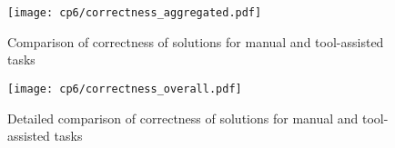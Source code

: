 


% 






\label{fig:correctness-overall}


\begin{figure}[h!]
    \centering
    \texttt{[image: cp6/correctness\_aggregated.pdf]}
    \caption{Comparison of correctness of solutions for manual and tool-assisted tasks}
    \label{fig:correctness-overall}
\end{figure}






\begin{figure}[h!]
    \centering
    \texttt{[image: cp6/correctness\_overall.pdf]}
    \caption{Detailed comparison of correctness of solutions for manual and tool-assisted tasks}
    \label{fig:correctness-by-task}
\end{figure}

